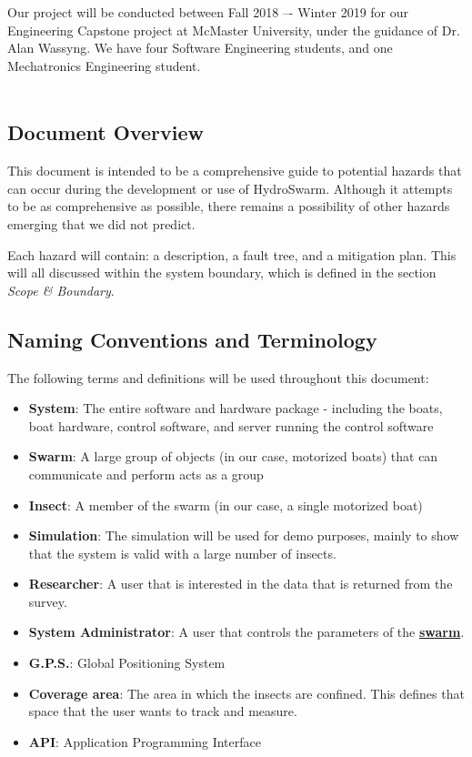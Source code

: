 \documentclass[11pt]{article}
\begin{document}
Our project will be conducted between Fall 2018 –- Winter 2019 for our Engineering Capstone project at McMaster University, under the guidance of Dr. Alan Wassyng. We have four Software Engineering students, and one Mechatronics Engineering student. \\ \\

\subsection{Document Overview}

This document is intended to be a comprehensive guide to potential hazards that can occur during the
development or use of HydroSwarm. Although it attempts to be as comprehensive as possible, there
remains a possibility of other hazards emerging that we did not predict.

Each hazard will contain: a description, a fault tree, and a mitigation plan. This will all discussed
within the system boundary, which is defined in the section \textit{Scope & Boundary}.

\subsection{Naming Conventions and Terminology}
\label{sec:definitions}
The following terms and definitions will be used throughout this document:
\begin{itemize}
\item \textbf{System}: The entire software and hardware package - including the boats,
boat hardware, control software, and server running the control software
\item \textbf{Swarm}: A large group of objects (in our case, motorized boats) that can communicate and perform acts as a group
\item \textbf{Insect}: A member of the swarm (in our case, a single motorized boat)
\item \textbf{Simulation}: The simulation will be used for demo purposes, mainly to show that
the system is valid with a large number of insects.
\item \textbf{Researcher}: A user that is interested in the data that is returned from the survey.
\item \textbf{System Administrator}: A user that controls the parameters of the \hyperref[sec:definitions]{\textbf{swarm}}.
\item \textbf{G.P.S.}: Global Positioning System
\item \textbf{Coverage area}: The area in which the insects are confined. This defines that space that the user wants to track and measure.
\item \textbf{API}: Application Programming Interface
\end{itemize}
\end{document}
